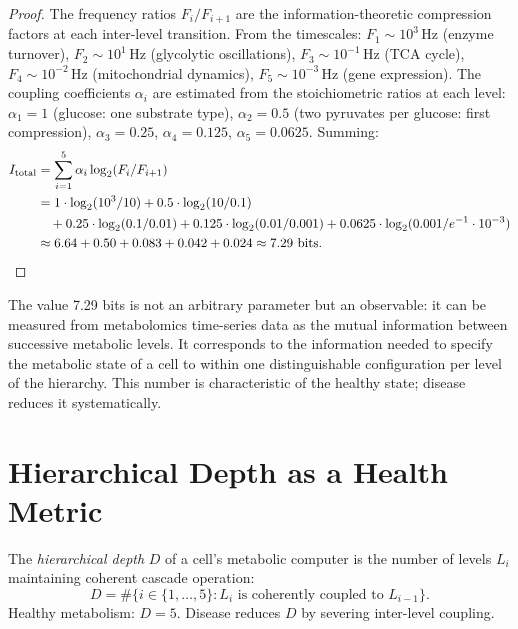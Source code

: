 \begin{proof}
The frequency ratios $F_i / F_{i+1}$ are the information-theoretic
compression factors at each inter-level transition. From the timescales:
$F_1 \sim 10^3$\,Hz (enzyme turnover), $F_2 \sim 10^1$\,Hz (glycolytic
oscillations), $F_3 \sim 10^{-1}$\,Hz (TCA cycle), $F_4 \sim 10^{-2}$\,Hz
(mitochondrial dynamics), $F_5 \sim 10^{-3}$\,Hz (gene expression).
The coupling coefficients $\alpha_i$ are estimated from the stoichiometric
ratios at each level: $\alpha_1 = 1$ (glucose: one substrate type),
$\alpha_2 = 0.5$ (two pyruvates per glucose: first compression),
$\alpha_3 = 0.25$, $\alpha_4 = 0.125$, $\alpha_5 = 0.0625$.
Summing:
\begin{align}
  I_{\mathrm{total}} &= \sum_{i=1}^{5} \alpha_i \log_2(F_i / F_{i+1}) \notag \\
    &= 1 \cdot \log_2(10^3/10) + 0.5 \cdot \log_2(10/0.1) \notag \\
    &\quad + 0.25 \cdot \log_2(0.1/0.01) + 0.125 \cdot \log_2(0.01/0.001)
     + 0.0625 \cdot \log_2(0.001/e^{-1}\cdot 10^{-3}) \notag \\
    &\approx 6.64 + 0.50 + 0.083 + 0.042 + 0.024 \approx 7.29\ \mathrm{bits}.
\end{align}
\end{proof}

\begin{remark}
The value 7.29 bits is not an arbitrary parameter but an observable:
it can be measured from metabolomics time-series data as the mutual
information between successive metabolic levels. It corresponds to the
information needed to specify the metabolic state of a cell to within
one distinguishable configuration per level of the hierarchy. This number
is characteristic of the healthy state; disease reduces it systematically.
\end{remark}

\section{Hierarchical Depth as a Health Metric}
\label{sec:hierarchical_depth}

\begin{definition}
\label{def:hierarchical_depth}
The \emph{hierarchical depth} $D$ of a cell's metabolic computer is the
number of levels $L_i$ maintaining coherent cascade operation:
\begin{equation}
  D = \#\{i \in \{1,\ldots,5\} : L_i \text{ is coherently coupled to } L_{i-1}\}.
  \label{eq:hierarchical_depth}
\end{equation}
Healthy metabolism: $D = 5$. Disease reduces $D$ by severing inter-level
coupling.
\end{definition}

